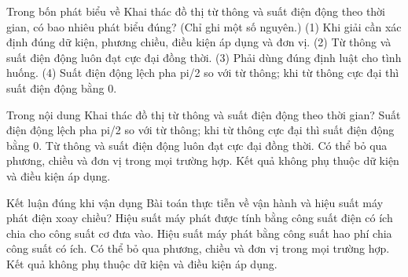 \begin{ex}
Trong bốn phát biểu về Khai thác đồ thị từ thông và suất điện động theo thời gian, có bao nhiêu phát biểu đúng? (Chỉ ghi một số nguyên.) (1) Khi giải cần xác định đúng dữ kiện, phương chiều, điều kiện áp dụng và đơn vị. (2) Từ thông và suất điện động luôn đạt cực đại đồng thời. (3) Phải dùng đúng định luật cho tình huống. (4) Suất điện động lệch pha pi/2 so với từ thông; khi từ thông cực đại thì suất điện động bằng 0.
\end{ex}

\begin{ex}
Trong nội dung Khai thác đồ thị từ thông và suất điện động theo thời gian?
\choice
{\True Suất điện động lệch pha pi/2 so với từ thông; khi từ thông cực đại thì suất điện động bằng 0.}
{Từ thông và suất điện động luôn đạt cực đại đồng thời.}
{Có thể bỏ qua phương, chiều và đơn vị trong mọi trường hợp.}
{Kết quả không phụ thuộc dữ kiện và điều kiện áp dụng.}
\end{ex}

\begin{ex}
Kết luận đúng khi vận dụng Bài toán thực tiễn về vận hành và hiệu suất máy phát điện xoay chiều?
\choice
{\True Hiệu suất máy phát được tính bằng công suất điện có ích chia cho công suất cơ đưa vào.}
{Hiệu suất máy phát bằng công suất hao phí chia công suất có ích.}
{Có thể bỏ qua phương, chiều và đơn vị trong mọi trường hợp.}
{Kết quả không phụ thuộc dữ kiện và điều kiện áp dụng.}
\end{ex}

